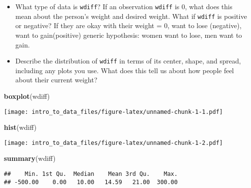 \documentclass[]{article}
\newenvironment{Shaded}{\begin{snugshade}}{\end{snugshade}}
\newcommand{\KeywordTok}[1]{\textcolor[rgb]{0.13,0.29,0.53}{\textbf{#1}}}
\newcommand{\StringTok}[1]{\textcolor[rgb]{0.31,0.60,0.02}{#1}}
\newcommand{\OperatorTok}[1]{\textcolor[rgb]{0.81,0.36,0.00}{\textbf{#1}}}
\newcommand{\NormalTok}[1]{#1}
\begin{document}
\begin{Shaded}
\end{Shaded}

\begin{itemize}
\item
  What type of data is \texttt{wdiff}? If an observation \texttt{wdiff}
  is 0, what does this mean about the person's weight and desired
  weight. What if \texttt{wdiff} is positive or negative? If they are
  okay with their weight = 0, want to lose (negative), want to
  gain(positive) generic hypothesis: women want to lose, men want to
  gain.
\item
  Describe the distribution of \texttt{wdiff} in terms of its center,
  shape, and spread, including any plots you use. What does this tell us
  about how people feel about their current weight?
\end{itemize}

\begin{Shaded}
\begin{Highlighting}[]
\KeywordTok{boxplot}\NormalTok{(wdiff)}
\end{Highlighting}
\end{Shaded}

\texttt{[image: intro\_to\_data\_files/figure-latex/unnamed-chunk-1-1.pdf]}

\begin{Shaded}
\begin{Highlighting}[]
\KeywordTok{hist}\NormalTok{(wdiff)}
\end{Highlighting}
\end{Shaded}

\texttt{[image: intro\_to\_data\_files/figure-latex/unnamed-chunk-1-2.pdf]}

\begin{Shaded}
\begin{Highlighting}[]
\KeywordTok{summary}\NormalTok{(wdiff)}
\end{Highlighting}
\end{Shaded}

\begin{verbatim}
##    Min. 1st Qu.  Median    Mean 3rd Qu.    Max. 
## -500.00    0.00   10.00   14.59   21.00  300.00
\end{verbatim}
\end{document}
